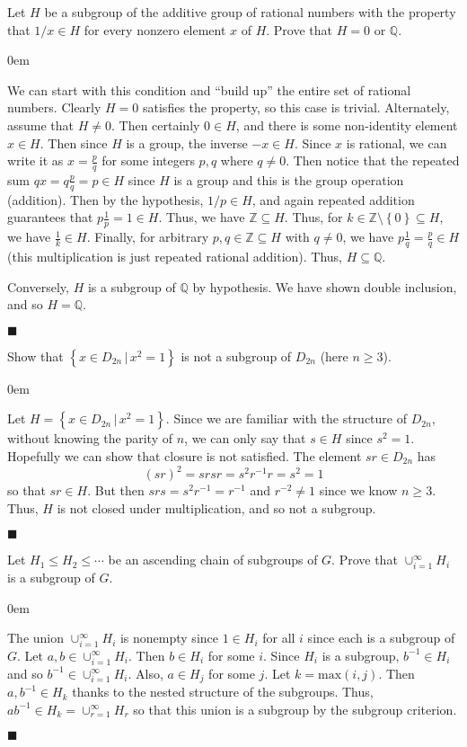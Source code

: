 \documentclass[12pt]{article}
\renewcommand{\qed}{\hfill$\blacksquare$}
\renewenvironment{proof}{\begin{addmargin}[1em]{0em}\begin{newproof}}{\end{newproof}\end{addmargin}\qed}
\newenvironment{problem}[2][Exercise]{\begin{trivlist}
\item[\hskip \labelsep {\bfseries #1}\hskip \labelsep {\bfseries #2.}]}{\end{trivlist}}
\begin{document}
\begin{problem}{1.2.13}
Let $H$ be a subgroup of the additive group of rational numbers with the property that $1/x \in H$ for every nonzero element $x$ of $H$. Prove that $H=0$ or $\mathbb{Q}$.
\end{problem}
\begin{proof}
We can start with this condition and ``build up'' the entire set of rational numbers. Clearly $H=0$ satisfies the property, so this case is trivial. Alternately, assume that $H\neq 0$. Then certainly $0 \in H$, and there is some non-identity element $x \in H$. Then since $H$ is a group, the inverse $-x \in H$. Since $x$ is rational, we can write it as $x = \frac{p}{q}$ for some integers $p,q$ where $q\neq 0$. Then notice that the repeated sum $qx = q\frac{p}{q} = p \in H$ since $H$ is a group and this is the group operation (addition). Then by the hypothesis, $1/p \in H$, and again repeated addition guarantees that $p\frac{1}{p}=1 \in H$. Thus, we have $\mathbb{Z} \subseteq H$. Thus, for $k\in \mathbb{Z}\setminus \left\{0\right\} \subseteq H$, we have $\frac{1}{k} \in H$. Finally, for arbitrary $p,q \in \mathbb{Z} \subseteq H$ with $q\neq 0$, we have $p\frac{1}{q} = \frac{p}{q}\in H$ (this multiplication is just repeated rational addition). Thus, $H\subseteq \mathbb{Q}$.

Conversely, $H$ is a subgroup of $\mathbb{Q}$ by hypothesis. We have shown double inclusion, and so $H=\mathbb{Q}$.
\end{proof}


\begin{problem}{1.2.14}
Show that $\left\{x\in D_{2n}\, | \, x^2=1\right\}$ is not a subgroup of $D_{2n}$ (here $n\geq 3$).
\end{problem}
\begin{proof}
Let $H=\left\{x\in D_{2n}\, | \, x^2=1\right\}$. Since we are familiar with the structure of $D_{2n}$, without knowing the parity of $n$, we can only say that $s\in H$ since $s^2 = 1 $. Hopefully we can show that closure is not satisfied. The element $sr\in D_{2n}$ has \[ \left(sr\right)^2 = srsr = s^2r^{-1}r = s^2 = 1\] so that  $sr \in H$. But then $srs = s^2 r^{-1} = r^{-1}$ and $r^{-2} \neq 1$ since we know $n\geq 3$. Thus, $H$ is not closed under multiplication, and so not a subgroup.
\end{proof}



\begin{problem}{1.2.15}
Let $H_1 \leq H_2 \leq \cdots $ be an ascending chain of subgroups of $G$. Prove that $\cup_{i=1}^{\infty} H_i$ is a subgroup of $G$.
\end{problem}
\begin{proof}
The union $\cup_{i=1}^{\infty}H_i$ is nonempty since $1\in H_i$ for all $i$ since each is a subgroup of $G$. Let $a,b \in \cup_{i=1}^{\infty} H_i$. Then $b\in H_i$ for some $i$. Since $H_i$ is a subgroup, $b^{-1}\in H_i$ and so $b^{-1} \in \cup_{i=1}^{\infty} H_i$. Also, $a\in H_j$ for some $j$. Let $k=\text{max}\left(i,j\right)$. Then $a,b^{-1} \in H_k$ thanks to the nested structure of the subgroups. Thus, $ab^{-1} \in H_k = \cup_{r=1}^{\infty} H_r$ so that this union is a subgroup by the subgroup criterion.
\end{proof}
\end{document}
